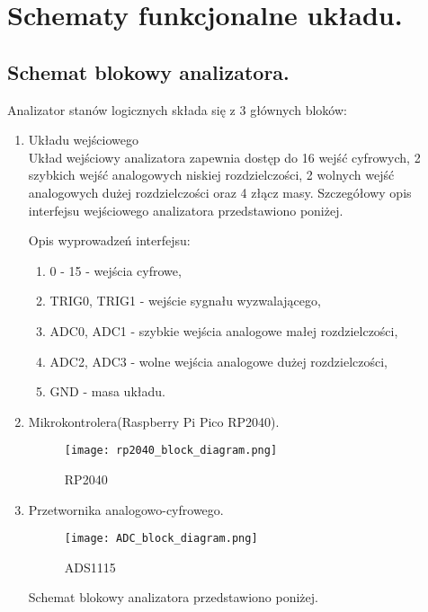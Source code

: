 \section{Schematy funkcjonalne układu.}

\subsection{Schemat blokowy analizatora.}
Analizator stanów logicznych składa się z 3 głównych bloków:
\begin{enumerate}
    \item Układu wejściowego\\
Układ wejściowy analizatora zapewnia dostęp do 16 wejść cyfrowych,
2 szybkich wejść analogowych niskiej rozdzielczości, 2 wolnych wejść
analogowych dużej rozdzielczości oraz 4 złącz masy. Szczegółowy opis 
interfejsu wejściowego analizatora przedstawiono poniżej.


Opis wyprowadzeń interfejsu:
\begin{enumerate}
    \item 0 - 15 - wejścia cyfrowe,
    \item TRIG0, TRIG1 - wejście sygnału wyzwalającego,
    \item ADC0, ADC1 - szybkie wejścia analogowe małej rozdzielczości,
    \item ADC2, ADC3 - wolne wejścia analogowe dużej rozdzielczości,
    \item GND - masa układu.
\end{enumerate} 

    \item Mikrokontrolera(Raspberry Pi Pico RP2040).
    \begin{figure}[H]
        \centering
        \texttt{[image: rp2040\_block\_diagram.png]}
        \caption{RP2040}
        \label{fig:RP2040}
    \end{figure}

    \newpage
    \item Przetwornika analogowo-cyfrowego.
    \begin{figure}[H]
        \centering
        \texttt{[image: ADC\_block\_diagram.png]}
        \caption{ADS1115}
        \label{fig:ADS1115}
    \end{figure}

Schemat blokowy analizatora przedstawiono poniżej.

\end{enumerate}

